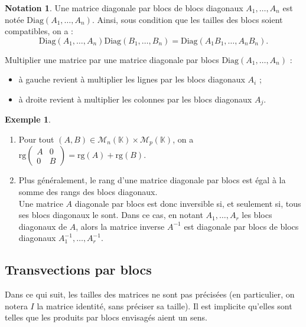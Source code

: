 \documentclass[french]{article}
\newcommand{\K}{\mathbb{K}}
\newcommand{\inv}{^{-1}}
\newcommand{\rg}{\text{rg}}
\theoremstyle{plain}
\theoremstyle{definition}
\newtheorem*{ex}{Exemple}
\newtheorem*{notation}{Notation}
\theoremstyle{remark}
\begin{document}
\begin{notation}
	Une matrice diagonale par blocs de blocs diagonaux $A_1,\ldots,A_n$ est notée $\text{Diag}(A_1,\ldots,A_n)$. Ainsi, sous condition que les tailles des blocs soient compatibles, on a :
	$$\text{Diag}(A_1,\ldots,A_n)\text{Diag}(B_1,\ldots,B_n)=\text{Diag}(A_1B_1,\ldots,A_nB_n).$$
\end{notation}

\begin{met}
	Multiplier une matrice par une matrice diagonale par blocs $\text{Diag}(A_1,\ldots,A_n)$ :
	\begin{itemize}
		\item à gauche revient à multiplier les lignes par les blocs diagonaux $A_i$ ;
		\item à droite revient à multiplier les colonnes par les blocs diagonaux $A_j$.
	\end{itemize}
\end{met}

\begin{ex}
	\begin{enumerate}
		\item Pour tout $(A,B)\in\mathcal{M}_n(\K)\times\mathcal{M}_p(\K)$, on a $\rg\begin{pmatrix}
			A&0\\
			0&B
		\end{pmatrix}=\rg(A)+\rg(B)$.
		\item Plus généralement, le rang d'une matrice diagonale par blocs est égal à la somme des rangs des blocs diagonaux.\\
		Une matrice $A$ diagonale par blocs est donc inversible si, et seulement si, tous ses blocs diagonaux le sont. Dans ce cas, en notant $A_1,\ldots,A_r$ les blocs diagonaux de $A$, alors la matrice inverse $A\inv$ est diagonale par blocs de blocs diagonaux $A_1\inv,\ldots,A_r\inv$.
	\end{enumerate}
\end{ex}

\subsection{Transvections par blocs}

Dans ce qui suit, les tailles des matrices ne sont pas précisées (en particulier, on notera $I$ la matrice identité, sans préciser sa taille). Il est implicite qu'elles sont telles que les produits par blocs envisagés aient un sens.
\end{document}

